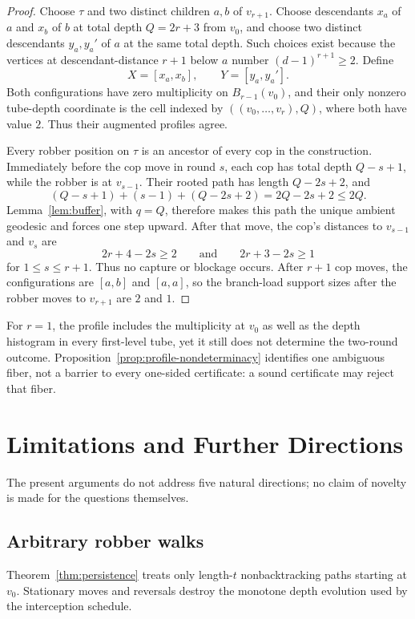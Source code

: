 \documentclass[11pt]{amsart}
\theoremstyle{definition}
\begin{document}
\begin{proof}
Choose $\tau$ and two distinct children $a,b$ of $v_{r+1}$. Choose descendants $x_a$ of $a$ and $x_b$ of $b$ at total depth $Q=2r+3$ from $v_0$, and choose two distinct descendants $y_a,y_a'$ of $a$ at the same total depth. Such choices exist because the vertices at descendant-distance $r+1$ below $a$ number $(d-1)^{r+1}\geq2$. Define
\[
X=[x_a,x_b],
\qquad
Y=[y_a,y_a'].
\]
Both configurations have zero multiplicity on $B_{r-1}(v_0)$, and their only nonzero tube-depth coordinate is the cell indexed by $((v_0,\ldots,v_r),Q)$, where both have value $2$. Thus their augmented profiles agree.

Every robber position on $\tau$ is an ancestor of every cop in the construction. Immediately before the cop move in round $s$, each cop has total depth $Q-s+1$, while the robber is at $v_{s-1}$. Their rooted path has length $Q-2s+2$, and
\[
(Q-s+1)+(s-1)+(Q-2s+2)=2Q-2s+2\leq2Q.
\]
Lemma~\ref{lem:buffer}, with $q=Q$, therefore makes this path the unique ambient geodesic and forces one step upward. After that move, the cop's distances to $v_{s-1}$ and $v_s$ are
\[
2r+4-2s\geq2
\qquad\text{and}\qquad
2r+3-2s\geq1
\]
for $1\leq s\leq r+1$. Thus no capture or blockage occurs. After $r+1$ cop moves, the configurations are $[a,b]$ and $[a,a]$, so the branch-load support sizes after the robber moves to $v_{r+1}$ are $2$ and $1$.
\end{proof}

For $r=1$, the profile includes the multiplicity at $v_0$ as well as the depth histogram in every first-level tube, yet it still does not determine the two-round outcome. Proposition~\ref{prop:profile-nondeterminacy} identifies one ambiguous fiber, not a barrier to every one-sided certificate: a sound certificate may reject that fiber.

\section{Limitations and Further Directions}
\label{sec:open}

The present arguments do not address five natural directions; no claim of novelty is made for the questions themselves.

\subsection{Arbitrary robber walks}

Theorem~\ref{thm:persistence} treats only length-$t$ nonbacktracking paths starting at $v_0$. Stationary moves and reversals destroy the monotone depth evolution used by the interception schedule.
\end{document}
